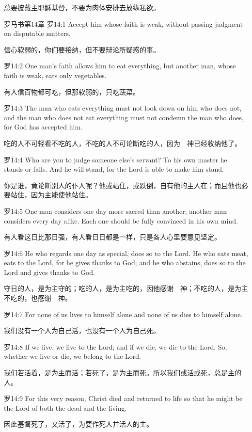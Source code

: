 \documentclass[a4paper,11pt,onecolumn,twoside]{ctexart}
\begin{document}
\begin{multicols}{2}
 总要披戴主耶稣基督，不要为肉体安排去放纵私欲。


 罗马书第14章
 罗14:1
 Accept him whose faith is weak, without passing judgment on disputable matters.

 信心软弱的，你们要接纳，但不要辩论所疑惑的事。


 罗14:2
 One man's faith allows him to eat everything, but another man, whose faith is weak, eats only vegetables.

 有人信百物都可吃，但那软弱的，只吃蔬菜。


 罗14:3
 The man who eats everything must not look down on him who does not, and the man who does not eat everything must not condemn the man who does, for God has accepted him.

 吃的人不可轻看不吃的人，不吃的人不可论断吃的人，因为　神已经收纳他了。


 罗14:4
 Who are you to judge someone else's servant? To his own master he stands or falls. And he will stand, for the Lord is able to make him stand.

 你是谁，竟论断别人的仆人呢？他或站住，或跌倒，自有他的主人在；而且他也必要站住，因为主能使他站住。


 罗14:5
 One man considers one day more sacred than another; another man considers every day alike. Each one should be fully convinced in his own mind.

 有人看这日比那日强，有人看日日都是一样，只是各人心里要意见坚定。


 罗14:6
 He who regards one day as special, does so to the Lord. He who eats meat, eats to the Lord, for he gives thanks to God; and he who abstains, does so to the Lord and gives thanks to God.

 守日的人，是为主守的；吃的人，是为主吃的，因他感谢　神；不吃的人，是为主不吃的，也感谢　神。


 罗14:7
 For none of us lives to himself alone and none of us dies to himself alone.

 我们没有一个人为自己活，也没有一个人为自己死。


 罗14:8
 If we live, we live to the Lord; and if we die, we die to the Lord. So, whether we live or die, we belong to the Lord.

 我们若活着，是为主而活；若死了，是为主而死。所以我们或活或死，总是主的人。


 罗14:9
 For this very reason, Christ died and returned to life so that he might be the Lord of both the dead and the living.

 因此基督死了，又活了，为要作死人并活人的主。



\end{multicols}
\end{document}
